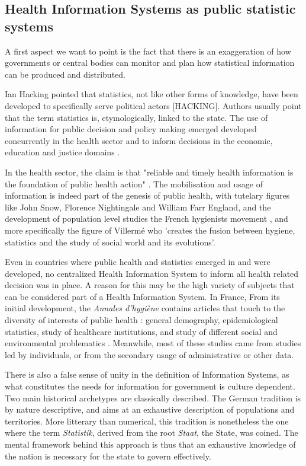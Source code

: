\documentclass[letterpaper, 10 pt, conference]{IEEEconf}  %
\begin{document}
\subsection{Health Information Systems as public statistic systems}

A first aspect we want to point is the fact that there is an exaggeration of how governments or central bodies can monitor and plan how statistical information can be produced and distributed.

Ian Hacking pointed that statistics, not like other forms of knowledge, have been developed to specifically serve political actors [HACKING]. Authors usually point that the term statistics is, etymologically, linked to the state. The use of information for public decision and policy making emerged developed concurrently in the health sector and to inform decisions in the economic, education and justice domains \cite{desrosieres_politique_1993, lecuyer_medecins_1977, porter_trust_1996}.

In the health sector, the claim is that "reliable and timely health information is the foundation of public health action" \cite{abou-zahr_health_2005, health_metrics_network_framework_2008}. The mobilisation and usage of information is indeed part of the genesis of public health, with tutelary figures like John Snow, Florence Nightingale and William Farr England, and the development of population level studies the French hygienists movement	\cite{porter_trust_1996}, and more specifically the figure of Villermé who 'creates the fusion between hygiene, statistics and the study of social world and its evolutions'.

Even in countries where public health and statistics emerged in and were developed, no centralized Health Information System to inform all health related decision was in place. A reason for this may be the high variety of subjects that can be considered part of a Health Information System. In France, From its initial development, the \textit{Annales d'hygiène} contains articles that touch to the diversity of interests of public health : general demography, epidemiological statistics, study of healthcare institutions, and study of different social and environmental problematics \cite{lecuyer_medecins_1977}. Meanwhile, most of these studies came from studies led by individuals, or from the secondary usage of administrative or other data.

There is also a false sense of unity in the definition of Information Systems, as what constitutes the needs for information for government is culture dependent. Two main historical archetypes are classically described. The German tradition is by nature descriptive, and aims at an exhaustive description of  populations and territories. More litterary than numerical, this tradition is nonetheless the one where the term \textit{Statistik}, derived from the root \textit{Staat}, the State, was coined. The mental framework behind this approach is thus that an exhaustive knowledge of the nation is necessary for the state to govern effectively.
\end{document}
